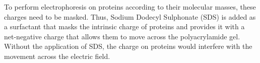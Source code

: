 \documentclass[pdflatex,sn-mathphys]{sn-jnl}%
\theoremstyle{thmstyleone}%
\theoremstyle{thmstyletwo}%
\theoremstyle{thmstylethree}%
\begin{document}
To perform electrophoresis on proteins according to their molecular masses, these charges need to be masked. Thus, Sodium Dodecyl Sulphonate (SDS) is added as a surfactant that masks the intrinsic charge of proteins and provides it with a net-negative charge that allows them to move across the polyacrylamide gel. Without the application of SDS, the charge on proteins would interfere with the movement across the electric field. 
\end{document}
